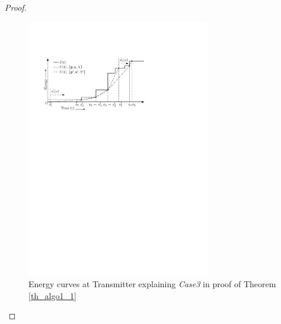 \begin{proof}
\begin{figure}[htb]
\centering
\centerline{\includegraphics[width=8cm]{Theorem1_sufficient.pdf}}
\caption{Energy curves at Transmitter explaining \textit{Case3} in proof of Theorem \ref{th_algo1_1}}
\label{Theorem1_figure}
\end{figure}


\end{proof}
